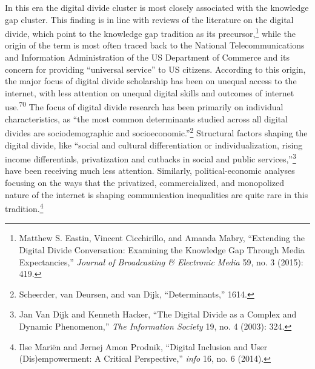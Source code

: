 \documentclass{tufte-handout}
\begin{document}
In this era the digital divide cluster is most closely associated with
the knowledge gap cluster. This finding is in line with reviews of the
literature on the digital divide, which point to the knowledge gap
tradition as its precursor,\footnote{Matthew S. Eastin, Vincent
  Cicchirillo, and Amanda Mabry, ``Extending the Digital Divide
  Conversation: Examining the Knowledge Gap Through Media
  Expectancies,'' \emph{Journal of Broadcasting \& Electronic Media} 59,
  no. 3 (2015): 419.} while the origin of the term is most often traced
back to the National Telecommunications and Information Administration
of the US Department of Commerce and its concern for providing
``universal service'' to US citizens. According to this origin, the
major focus of digital divide scholarship has been on unequal access to
the internet, with less attention on unequal digital skills and outcomes
of internet use.\textsuperscript{70} The
focus of digital divide research has been primarily on individual
characteristics, as ``the most common determinants studied across all
digital divides are sociodemographic and socioeconomic.''\footnote{Scheerder,
  van Deursen, and van Dijk, ``Determinants,'' 1614.} Structural factors
shaping the digital divide, like ``social and cultural differentiation
or individualization, rising income differentials, privatization and
cutbacks in social and public services,''\footnote{Jan Van Dijk and
  Kenneth Hacker, ``The Digital Divide as a Complex and Dynamic
  Phenomenon,'' \emph{The Information Society} 19, no. 4 (2003): 324.}
have been receiving much less attention. Similarly, political-economic
analyses focusing on the ways that the privatized, commercialized, and
monopolized nature of the internet is shaping communication inequalities
are quite rare in this tradition.\footnote{Ilse Mariën and Jernej Amon
  Prodnik, ``Digital Inclusion and User (Dis)empowerment: A Critical
  Perspective,'' \emph{info} 16, no. 6 (2014).}
\end{document}
